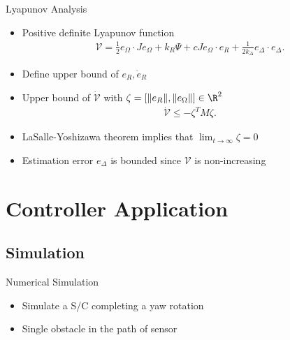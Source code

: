 \documentclass[11pt,professionalfonts]{beamer}
\begin{document}
\begin{frame}[label=proof]{Lyapunov Analysis}
\begin{itemize}
	\item Positive definite Lyapunov function
	\begin{align*}
		\mathcal{V} = \frac{1}{2} e_\Omega \cdot J e_\Omega + k_R \Psi + c J e_\Omega \cdot e_R + \frac{1}{2 k_\Delta} e_\Delta \cdot e_\Delta . \label{eqn:v_adapt}
	\end{align*}
	\pause
	\item Define upper bound of \( e_R, \dot{e}_{R}\)
	\item Upper bound of \( \dot{\mathcal{V}} \) with \(\zeta=[\|e_R\|,\|e_\Omega\|]\in\R^2\)
	\begin{align*}
		\dot{\mathcal{V}} \leq -\zeta^T M \zeta .
	\end{align*}
	\pause
	\item LaSalle-Yoshizawa theorem implies that \(\lim_{t\to\infty} \zeta=0\) 
	\item Estimation error \( e_\Delta \) is bounded since \( \mathcal{V} \) is non-increasing
\end{itemize}
\end{frame}

\section*{Controller Application}
\subsection*{Simulation}

\begin{frame}{Numerical Simulation} %

\begin{itemize}
	\item Simulate a S/C completing a yaw rotation
	\item Single obstacle in the path of sensor
\end{itemize}

~

\end{frame}%
\end{document}
